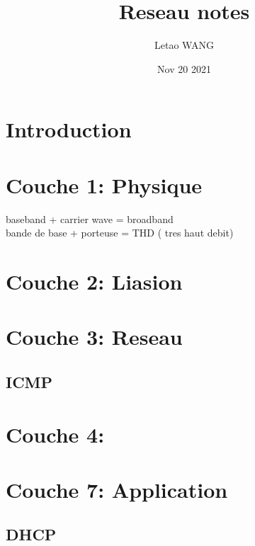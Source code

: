 \documentclass[12pt]{article}
\title{Reseau notes}
\author{Letao WANG}
\date{Nov 20 2021}
\begin{document}
\section{Introduction}

\section{Couche 1: Physique}
baseband + carrier wave = broadband\\
bande de base + porteuse = THD ( tres haut debit)

\section{Couche 2: Liasion}

\section{Couche 3: Reseau}
\subsection{ICMP}

\section{Couche 4: }

\section{Couche 7: Application}
\subsection{DHCP}
\end{document}
